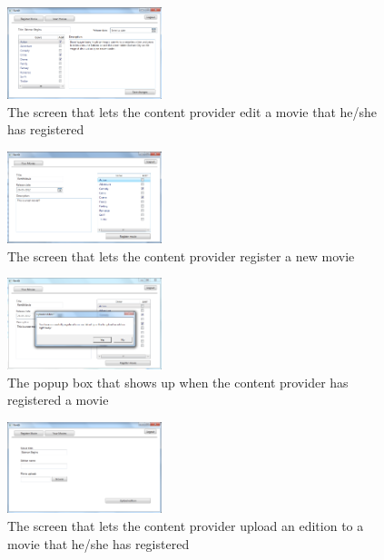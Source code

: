 \begin{figure}[h!]
  \centering
    \includegraphics[width=0.4\textwidth]{Parts/Appendix/Images/CPEditmovie}
  \caption{The screen that lets the content provider edit a movie that he/she has registered}
  \label{fig:Appendix_GUI_PrototypeCPEditmovie}
\end{figure}
\begin{figure}[h!]
  \centering
    \includegraphics[width=0.4\textwidth]{Parts/Appendix/Images/CPRegistermovie}
  \caption{The screen that lets the content provider register a new movie}
  \label{fig:Appendix_GUI_PrototypeCPRegister}
\end{figure}
\begin{figure}[h!]
  \centering
    \includegraphics[width=0.4\textwidth]{Parts/Appendix/Images/CPRegisterPopup}
  \caption{The popup box that shows up when the content provider has registered a movie}
  \label{fig:Appendix_GUI_PrototypeCPRegisterpopup}
\end{figure}
\begin{figure}[h!]
  \centering
    \includegraphics[width=0.4\textwidth]{Parts/Appendix/Images/CPUploadEdition}
  \caption{The screen that lets the content provider upload an edition to a movie that he/she has registered}
  \label{fig:Appendix_GUI_PrototypeCPUpload}
\end{figure}